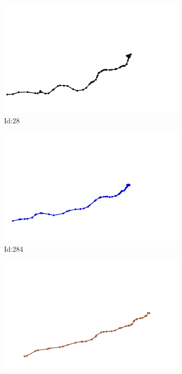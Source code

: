 \documentclass[12pt,twoside]{report}
\begin{document}
\begin{figure}
\centering
\begin{subfigure}[b]{0.20\textwidth}
\centering
\includegraphics[width=\textwidth]{../../trajectories/28.png}
\caption{Id:28}
\end{subfigure}
\begin{subfigure}[b]{0.20\textwidth}
\centering
\includegraphics[width=\textwidth]{../../trajectories/284.png}
\caption{Id:284}
\end{subfigure}
\begin{subfigure}[b]{0.20\textwidth}
\centering
\includegraphics[width=\textwidth]{../../trajectories/359.png}

\end{subfigure}
\end{figure}
\end{document}
